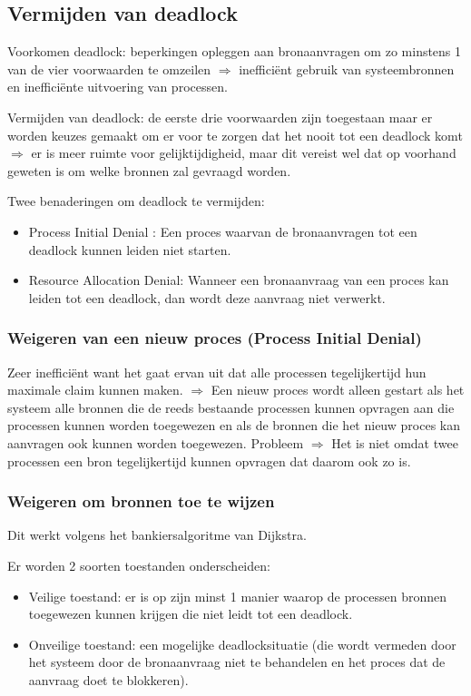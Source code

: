 \subsection{Vermijden van deadlock}

Voorkomen deadlock: beperkingen opleggen aan bronaanvragen om zo minstens 1 van de vier voorwaarden te omzeilen $\Rightarrow$ inefficiënt gebruik van systeembronnen en inefficiënte uitvoering van processen.

Vermijden van deadlock: de eerste drie voorwaarden zijn toegestaan maar er worden keuzes gemaakt om er voor te zorgen dat het nooit tot een deadlock komt $\Rightarrow$ er is meer ruimte voor gelijktijdigheid, maar dit vereist wel dat op voorhand geweten is om welke bronnen zal gevraagd worden.

Twee benaderingen om deadlock te vermijden:
\begin{itemize}
\item Process Initial Denial : Een proces waarvan de bronaanvragen tot een deadlock kunnen leiden niet starten.
\item Resource Allocation Denial: Wanneer een bronaanvraag van een proces kan leiden tot een deadlock, dan wordt deze aanvraag niet verwerkt.
\end{itemize}

\subsubsection{Weigeren van een nieuw proces (Process Initial Denial)}

Zeer inefficiënt want het gaat ervan uit dat alle processen tegelijkertijd hun maximale claim kunnen maken.
$\Rightarrow$ Een nieuw proces wordt alleen gestart als het systeem alle bronnen die de reeds bestaande processen kunnen opvragen aan die processen kunnen worden toegewezen en als de bronnen die het nieuw proces kan aanvragen ook kunnen worden toegewezen.
Probleem $\Rightarrow$ Het is niet omdat twee processen een bron tegelijkertijd kunnen opvragen dat daarom ook zo is.


\subsubsection{Weigeren om bronnen toe te wijzen}

Dit werkt volgens het bankiersalgoritme van Dijkstra. 

Er worden 2 soorten toestanden onderscheiden:

\begin{itemize}
\item Veilige toestand: er is op zijn minst 1 manier waarop de processen bronnen toegewezen kunnen krijgen die niet leidt tot een deadlock.
\item Onveilige toestand: een mogelijke deadlocksituatie (die wordt vermeden door het systeem door de bronaanvraag niet te behandelen en het proces dat de aanvraag doet te blokkeren).
\end{itemize}

